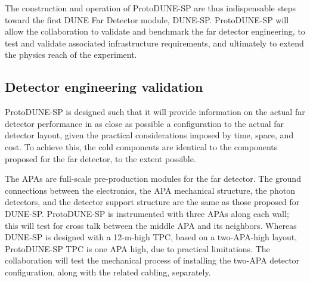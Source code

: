 The construction and operation of ProtoDUNE-SP are thus indispensable steps toward the first DUNE Far Detector module, DUNE-SP. ProtoDUNE-SP will allow the collaboration to validate and benchmark the far detector engineering, to test and validate associated infrastructure requirements, and ultimately to extend the physics reach of the experiment. 




\subsection{Detector engineering validation}  


ProtoDUNE-SP is designed such that it will provide information on the actual far detector performance in as close as possible a configuration to the actual far detector layout, given the practical considerations imposed by time, space, and cost. To achieve this, the cold components are identical to the components proposed for the far detector, to the extent possible. 

The APAs are full-scale pre-production modules for the far detector.  The ground connections between the electronics, the APA mechanical structure, the photon detectors, and the detector support structure are the same as those proposed for DUNE-SP. ProtoDUNE-SP is instrumented with three APAs along each wall; this will test for cross talk between the middle APA and its neighbors. Whereas DUNE-SP is designed with a 12-m-high TPC, based on a two-APA-high layout, ProtoDUNE-SP TPC is one APA high, due to practical limitations. The collaboration will test the mechanical process of installing the two-APA detector configuration, along with the related cabling, separately.

